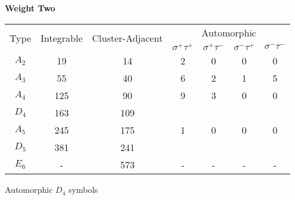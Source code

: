 \documentclass[12pt]{article}
\begin{document}
\begin{center}
{\bf Weight Two}

\begin{tabular}{ | c | c | c | c | c | c |  c |}
\multicolumn{1}{c}{\multirow{2}{*}{Type}} & \multicolumn{1}{c}{\multirow{2}{*}{Integrable}} & \multicolumn{1}{c}{\multirow{2}{*}{Cluster-Adjacent}} & \multicolumn{4}{c}{Automorphic} \\
\multicolumn{1}{c}{} & \multicolumn{1}{c}{} & \multicolumn{1}{c}{}  & \multicolumn{1}{c}{$\sigma^+ \tau^+$} & \multicolumn{1}{c}{$\sigma^+ \tau^-$} & \multicolumn{1}{c}{$\sigma^- \tau^+$} & \multicolumn{1}{c}{$\sigma^- \tau^-$} \\
\hline \(A_2\) & 19 & 14 & 2 & 0 & 0 & 0 \\ 
\hline \(A_3\) & 55 & 40 & 6 & 2 & 1 & 5 \\ 
\hline \(A_4\) & 125 & 90 & 9 & 3 & 0 & 0\\ 
\hline \(D_4\) & 163 & 109 &  \\ 
\hline \(A_5\) & 245 & 175 & 1 & 0 & 0 & 0 \\ 
\hline \(D_5\) & 381 & 241 & \\ 
\hline \(E_6\) & - & 573 & - & - & - & -  \\ 
\hline
\end{tabular}
\vspace{.6cm}

Automorphic $D_4$ symbols


\end{center}
\end{document}
